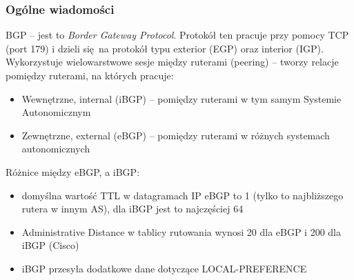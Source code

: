 \documentclass[a4paper, 12pt, titlepage]{article}
\begin{document}
			\subsubsection{Ogólne wiadomości}
				BGP -- jest to \textit{Border Gateway Protocol}. Protokół ten pracuje przy pomocy TCP (port 179) i dzieli się na protokół typu exterior (EGP) oraz interior (IGP). Wykorzystuje wielowarstwowe sesje między ruterami (peering) -- tworzy relacje pomiędzy ruterami, na których pracuje: 
				\begin{itemize}
					\item Wewnętrzne, internal (iBGP) -- pomiędzy ruterami w tym samym Systemie Autonomicznym
					\item Zewnętrzne, external (eBGP) -- pomiędzy ruterami w różnych systemach autonomicznych
				\end{itemize}
				Różnice między eBGP, a iBGP:
				\begin{itemize}
					\item domyślna wartość TTL w datagramach IP eBGP to 1 (tylko to najbliższego rutera w innym AS), dla iBGP jest to najczęściej 64
					\item Administrative Distance w tablicy rutowania wynosi 20 dla eBGP i 200 dla iBGP (Cisco)
					\item iBGP przesyła dodatkowe dane dotyczące LOCAL-PREFERENCE
				\end{itemize}
\end{document}
